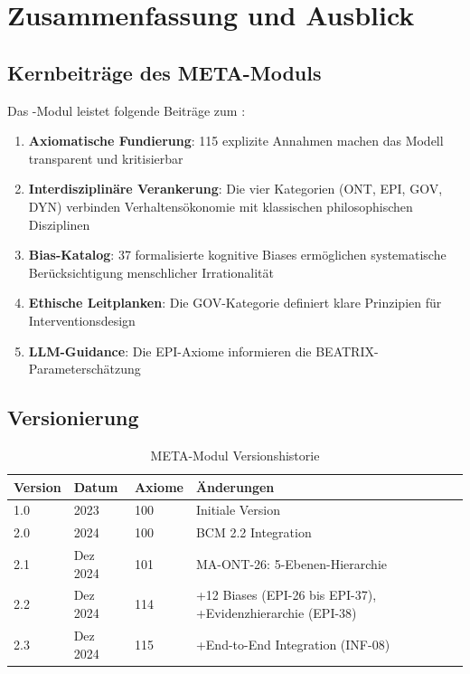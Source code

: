 \section{Zusammenfassung und Ausblick}

\subsection{Kernbeiträge des META-Moduls}

Das \META-Modul leistet folgende Beiträge zum \BCM:

\begin{enumerate}
    \item \textbf{Axiomatische Fundierung}: 115 explizite Annahmen machen das Modell transparent und kritisierbar
    \item \textbf{Interdisziplinäre Verankerung}: Die vier Kategorien (ONT, EPI, GOV, DYN) verbinden Verhaltensökonomie mit klassischen philosophischen Disziplinen
    \item \textbf{Bias-Katalog}: 37 formalisierte kognitive Biases ermöglichen systematische Berücksichtigung menschlicher Irrationalität
    \item \textbf{Ethische Leitplanken}: Die GOV-Kategorie definiert klare Prinzipien für Interventionsdesign
    \item \textbf{LLM-Guidance}: Die EPI-Axiome informieren die BEATRIX-Parameterschätzung
\end{enumerate}

\subsection{Versionierung}

\begin{table}[h]
\centering
\caption{META-Modul Versionshistorie}
\begin{tabular}{@{}llll@{}}
\toprule
\textbf{Version} & \textbf{Datum} & \textbf{Axiome} & \textbf{Änderungen} \\
\midrule
1.0 & 2023 & 100 & Initiale Version \\
2.0 & 2024 & 100 & BCM 2.2 Integration \\
2.1 & Dez 2024 & 101 & MA-ONT-26: 5-Ebenen-Hierarchie \\
2.2 & Dez 2024 & 114 & +12 Biases (EPI-26 bis EPI-37), +Evidenzhierarchie (EPI-38) \\
2.3 & Dez 2024 & 115 & +End-to-End Integration (INF-08) \\
\bottomrule
\end{tabular}
\end{table}

